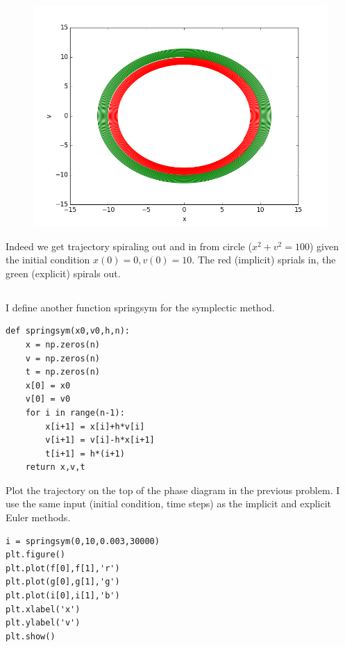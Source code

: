 \documentclass[10pt]{article}
\begin{document}
\begin{figure}[!h]
\centering
\includegraphics[scale=0.5]{w3fig9.png}
\end{figure}

Indeed we get trajectory spiraling out and in from circle ($x^2 + v^2 = 100$) given the initial condition $x(0)=0, v(0) = 10$. The red (implicit) sprials in, the green (explicit) spirals out. \\

\subsection{}
I define another function springsym for the symplectic method.\\
\begin{lstlisting}
def springsym(x0,v0,h,n):
    x = np.zeros(n)
    v = np.zeros(n)
    t = np.zeros(n)
    x[0] = x0
    v[0] = v0
    for i in range(n-1):
        x[i+1] = x[i]+h*v[i]
        v[i+1] = v[i]-h*x[i+1]
        t[i+1] = h*(i+1)
    return x,v,t
\end{lstlisting}

Plot the trajectory on the top of the phase diagram in the previous problem. I use the same input (initial condition, time steps) as the implicit and explicit Euler methods. \\

\begin{lstlisting}
i = springsym(0,10,0.003,30000)
plt.figure()
plt.plot(f[0],f[1],'r')
plt.plot(g[0],g[1],'g')
plt.plot(i[0],i[1],'b')
plt.xlabel('x')
plt.ylabel('v')
plt.show()
\end{lstlisting}
\end{document}
